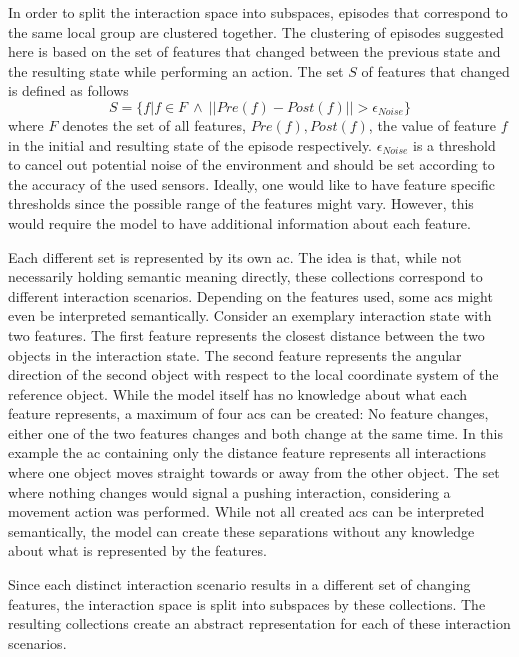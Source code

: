 In order to split the interaction space into subspaces, episodes that correspond to the same local group are clustered together.
The clustering of episodes suggested here is based on the set of features that changed between the previous state and the resulting state while performing an action. The set $S$ of features that changed is defined as follows 
\begin{equation}
S = \{f | f \in F ~ \wedge ~ ||Pre(f)-Post(f)|| > \epsilon_{Noise}\}
\label{eq:difSet}
\end{equation}
where $F$ denotes the set of all features, $Pre(f), Post(f)$, the value of 
feature $f$ in the initial and resulting state of the episode respectively. $\epsilon_{Noise}$ is a threshold to cancel out potential noise of the environment and should be set according to the accuracy of the used sensors. Ideally, one would like to have feature specific thresholds since the possible range of the features might vary. However, this would require the model to have additional information about each feature.

Each different set is represented by its own \gls{ac}. The 
idea is that, while not necessarily holding semantic meaning directly, these collections correspond to different interaction scenarios. Depending on the features used, some \glspl{ac} might even be interpreted semantically.
Consider an exemplary interaction state with two features. The first feature represents the closest distance between the two objects in the interaction state. The second feature represents the angular direction of the second object with respect to the local coordinate system of the reference object. While the model itself has no knowledge about what each feature represents, a maximum of four \glspl{ac} can be created: No feature changes, either one of the two features changes and both change at the same time. In this example the \gls{ac} containing only the distance feature represents all interactions where one object moves straight towards or away from the other object. The set where nothing changes would signal a pushing interaction, considering a movement action was performed. While not all created \glspl{ac} can be interpreted semantically, the model can create these separations without any knowledge about what is represented by the features.

Since each distinct interaction scenario results in a different set of changing features, the interaction space is split into subspaces by these collections. The resulting collections create an abstract representation for each of these interaction scenarios. 

